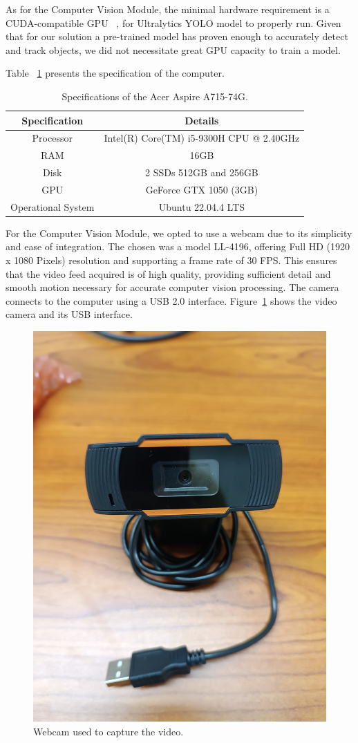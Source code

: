 As for the Computer Vision Module, the minimal hardware requirement is a CUDA-compatible GPU ~\cite{ultralytics_faq}, for Ultralytics YOLO model to properly run.
Given that for our solution a pre-trained model has proven enough to accurately detect and track objects, we did not necessitate great GPU capacity to train a model.

Table ~\ref{tab:specs_pc} presents the specification of the computer.

\begin{table}[H]
    \caption{Specifications of the Acer Aspire A715-74G.}
    \label{tab:specs_pc}
    \begin{tabular}{|c|c|}
        \hline
        \textbf{Specification} & \textbf{Details} \\ \hline
        Processor                      &           Intel(R) Core(TM) i5-9300H CPU @ 2.40GHz   \\ \hline
        RAM                      &          16GB        \\ \hline
        Disk                      &   2 SSDs  512GB and 256GB         \\ \hline
        GPU                     &   GeForce GTX 1050 (3GB)      \\ \hline
        Operational System & Ubuntu 22.04.4 LTS                  \\ \hline
    \end{tabular}
\end{table}

For the Computer Vision Module, we opted to use a webcam due to its simplicity and ease of integration.
The chosen was a model LL-4196, offering Full HD (1920 x 1080 Pixels) resolution and supporting a frame rate of 30 FPS\@.
This ensures that the video feed acquired is of high quality, providing sufficient detail and smooth motion necessary for accurate computer vision processing.
The camera connects to the computer using a USB 2.0 interface.
Figure~\ref{fig:camera} shows the video camera and its USB interface.

\begin{figure}[H]
    \centering
    \includegraphics[width=0.3\linewidth]{figures/webcam}
    \caption{Webcam used to capture the video.}
    \label{fig:camera}
\end{figure}

